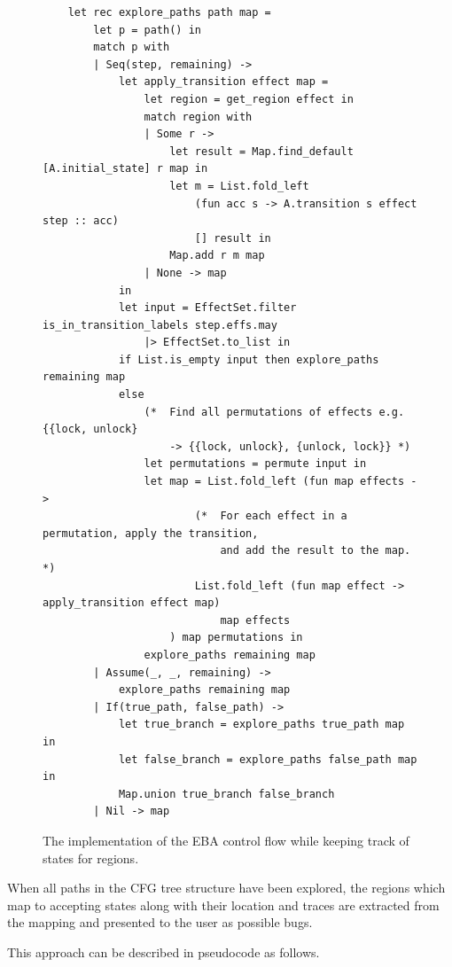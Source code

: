\begin{figure}[H]
    \centering
    \begin{verbatim}
    let rec explore_paths path map = 
        let p = path() in
        match p with
        | Seq(step, remaining) -> 
            let apply_transition effect map = 
                let region = get_region effect in 
                match region with 
                | Some r -> 
                    let result = Map.find_default [A.initial_state] r map in 
                    let m = List.fold_left 
                        (fun acc s -> A.transition s effect step :: acc)
                        [] result in
                    Map.add r m map
                | None -> map
            in
            let input = EffectSet.filter is_in_transition_labels step.effs.may 
                |> EffectSet.to_list in
            if List.is_empty input then explore_paths remaining map 
            else 
                (*  Find all permutations of effects e.g. {{lock, unlock} 
                    -> {{lock, unlock}, {unlock, lock}} *)
                let permutations = permute input in 
                let map = List.fold_left (fun map effects ->
                        (*  For each effect in a permutation, apply the transition, 
                            and add the result to the map. *)
                        List.fold_left (fun map effect -> apply_transition effect map) 
                            map effects
                    ) map permutations in
                explore_paths remaining map
        | Assume(_, _, remaining) -> 
            explore_paths remaining map
        | If(true_path, false_path) -> 
            let true_branch = explore_paths true_path map in
            let false_branch = explore_paths false_path map in 
            Map.union true_branch false_branch
        | Nil -> map
    \end{verbatim}
    \caption{The implementation of the EBA control flow while keeping track of states for regions.}
    \label{explore_tree-implementation}
\end{figure}

\noindent When all paths in the CFG tree structure have been explored, the regions which map to accepting states along with their location and traces are extracted from the mapping and presented to the user as possible bugs.  

\newpar This approach can be described in pseudocode as follows.

